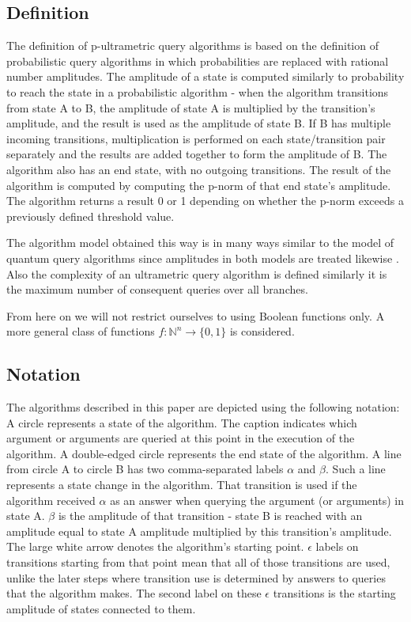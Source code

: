 \documentclass{llncs}
\begin{document}
\subsection{Definition}
The definition of p-ultrametric query algorithms is based on the definition of probabilistic query algorithms in which probabilities are replaced with rational number amplitudes. The amplitude of a state is computed similarly to probability to reach the state in a probabilistic algorithm - when the algorithm transitions from state A to B, the amplitude of state A is multiplied by the transition's amplitude, and the result is used as the amplitude of state B. If B has multiple incoming transitions, multiplication is performed on each state/transition pair separately and the results are added together to form the amplitude of B. The algorithm also has an end state, with no outgoing transitions. The result of the algorithm is computed by computing the p-norm of that end state's amplitude. The algorithm returns a result 0 or 1 depending on whether the p-norm exceeds a previously defined threshold value.

The algorithm model obtained this way is in many ways similar to the model of quantum query algorithms since amplitudes in both models are treated likewise \cite{Amb02} \cite{Vas10}. Also the complexity of an ultrametric query algorithm is defined similarly it is the maximum number of consequent queries over all branches.

From here on we will not restrict ourselves to using Boolean functions only. A more general class of functions $f:\mathbb{N}^n \rightarrow \{0,1\}$ is considered.

\subsection{Notation}
The algorithms described in this paper are depicted using the following notation:
A circle represents a state of the algorithm. The caption indicates which argument or arguments are queried at this point in the execution of the algorithm. A double-edged circle represents the end state of the algorithm.
A line from circle A to circle B has two comma-separated labels $\alpha$ and $\beta$. Such a line represents a state change in the algorithm. That transition is used if the algorithm received $\alpha$ as an answer when querying the argument (or arguments) in state A. $\beta$ is the amplitude of that transition - state B is reached with an amplitude equal to state A amplitude multiplied by this transition's amplitude.
The large white arrow denotes the algorithm's starting point. $\epsilon$ labels on transitions starting from that point mean that all of those transitions are used, unlike the later steps where transition use is determined by answers to queries that the algorithm makes. The second label on these $\epsilon$ transitions is the starting amplitude of states connected to them.
\end{document}
